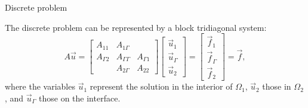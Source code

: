 \documentclass{beamer}
\begin{document}
\begin{frame}{Discrete problem}

The discrete problem can be represented by a block tridiagonal system:
\begin{equation*}
	A \vec{u} = \begin{bmatrix} A_{11} & A_{1 \Gamma} \\ A_{\Gamma 2} & A_{\Gamma \Gamma} & A_{\Gamma 1} \\ ~ & A_{2 \Gamma} & A_{22} \end{bmatrix} \begin{bmatrix} \vec{u}_1 \\ \vec{u}_\Gamma \\ \vec{u}_2 \end{bmatrix} = \begin{bmatrix} \vec{f}_1 \\ \vec{f}_\Gamma \\ \vec{f}_2 \end{bmatrix} = \vec{f},
\end{equation*}
where the variables $\vec{u}_1$ represent the solution in the interior of $\Omega_1$, $\vec{u}_2$ those in $\Omega_2$, and $\vec{u}_\Gamma$ those on the interface.
\end{frame}

\end{document}
